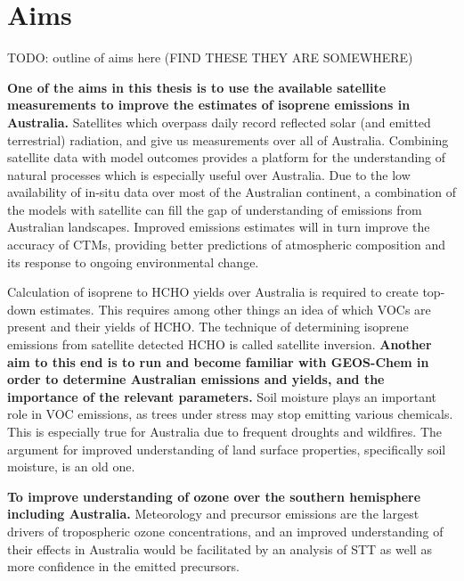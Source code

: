\section{Aims}
\label{LR:Aims}
TODO: outline of aims here (FIND THESE THEY ARE SOMEWHERE)
  
  \textbf{One of the aims in this thesis is to use the available satellite measurements to improve the estimates of isoprene emissions in Australia.}
  Satellites which overpass daily record reflected solar (and emitted terrestrial) radiation, and give us measurements over all of Australia.
  Combining satellite data with model outcomes provides a platform for the understanding of natural processes which is especially useful over Australia.
  Due to the low availability of in-situ data over most of the Australian continent, a combination of the models with satellite can fill the gap of understanding of emissions from Australian landscapes.
  Improved emissions estimates will in turn improve the accuracy of CTMs, providing better predictions of atmospheric composition and its response to ongoing environmental change.
  
  Calculation of isoprene to HCHO yields over Australia is required to create top-down estimates.
  This requires among other things an idea of which VOCs are present and their yields of HCHO.
  The technique of determining isoprene emissions from satellite detected HCHO is called satellite inversion.
  \textbf{Another aim to this end is to run and become familiar with GEOS-Chem in order to determine Australian emissions and yields, and the importance of the relevant parameters.}
  Soil moisture plays an important role in VOC emissions, as trees under stress may stop emitting various chemicals. 
  This is especially true for Australia due to frequent droughts and wildfires.
  The argument for improved understanding of land surface properties, specifically soil moisture, is an old one\citep{Mintz1982, Rowntree1983, Chen2001}.
  
  \textbf{To improve understanding of ozone over the southern hemisphere including Australia.}
  Meteorology and precursor emissions are the largest drivers of tropospheric ozone concentrations, and an improved understanding of their effects in Australia would be facilitated by an analysis of STT as well as more confidence in the emitted precursors.
  
